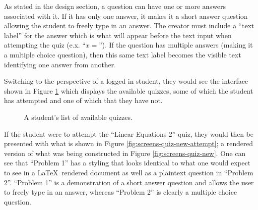 As stated in the design section, a question can have one or more answers associated with it. If it has only one answer, it makes it a short answer question allowing the student to freely type in an answer. The creator must include a ``text label'' for the answer which is what will appear before the text input when attempting the quiz (e.x. ``$x = $''). If the question has multiple answers (making it a multiple choice question), then this same text label becomes the visible text identifying one answer from another.

Switching to the perspective of a logged in student, they would see the interface shown in Figure \ref{fig:screens-quiz-list-student} which displays the available quizzes, some of which the student has attempted and one of which that they have not.

\begin{figure}[h!]
	\centering
	\caption{A student's list of available quizzes.}
	\label{fig:screens-quiz-list-student}
\end{figure}

If the student were to attempt the ``Linear Equations 2'' quiz, they would then be presented with what is shown in Figure \ref{fig:screens-quiz-new-attempt}; a rendered version of what was being constructed in Figure \ref{fig:screens-quiz-new}. One can see that ``Problem 1'' has a styling that looks identical to what one would expect to see in a \LaTeX\ rendered document as well as a plaintext question in ``Problem 2''. ``Problem 1'' is a demonstration of a short answer question and allows the user to freely type in an answer, whereas ``Problem 2'' is clearly a multiple choice question.

